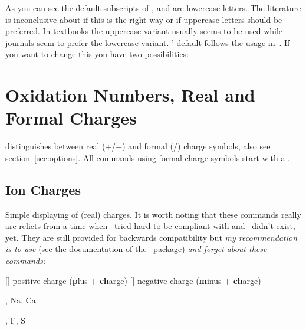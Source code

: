 \documentclass[load-preamble+]{cnltx-doc}
\begin{document}
As you can see the default subscripts of , 
and  are lowercase letters.  The literature is inconclusive about if
this is the right way or if uppercase letters should be preferred.  In
textbooks the uppercase variant usually seems to be used while journals seem
to prefer the lowercase variant.  \chemmacros' default follows the usage
in~\cite{iupac:greenbook}.  If you want to change this you have two
possibilities:

\begin{example}
  \pKa
\end{example}

\section{Oxidation Numbers, Real and Formal Charges}\label{sec:ladungen}

\chemmacros{} distinguishes between real ($+$/$-$) and formal (\fplus/\fminus)
charge symbols, also see section~\ref{sec:options}.  All commands using formal
charge symbols start with a .

\subsection{Ion Charges}\label{ssec:ionen}

Simple displaying of (real) charges.  It is worth noting that these commands
really are relicts from a time when \chemmacros\ tried hard to be compliant
with  and \chemformula\ didn't exist, yet.  They are still provided
for backwards compatibility but \emph{my recommendation is to use} 
(see the documentation of the \chemformula\ package) \emph{and forget about
  these commands:}
\begin{commands}
  []
    positive charge (\textbf{p}lus + \textbf{ch}arge)
  []
    negative charge (\textbf{m}inus + \textbf{ch}arge)
\end{commands}

\begin{example}
  \leavevmode
  \pch, Na\pch, Ca\pch[2]\par
  \leavevmode
  \mch, F\mch, S\mch[2]
\end{example}
\end{document}
